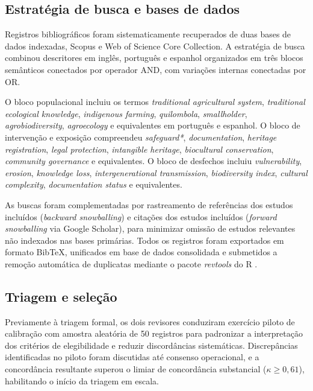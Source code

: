 \subsection{Estratégia de busca e bases de dados}
\label{sec:search_cap2}

Registros bibliográficos foram sistematicamente recuperados de duas bases de dados indexadas, Scopus e Web of Science Core Collection. A estratégia de busca combinou descritores em inglês, português e espanhol organizados em três blocos semânticos conectados por operador AND, com variações internas conectadas por OR.

O bloco populacional incluiu os termos \textit{traditional agricultural system}, \textit{traditional ecological knowledge}, \textit{indigenous farming}, \textit{quilombola}, \textit{smallholder}, \textit{agrobiodiversity}, \textit{agroecology} e equivalentes em português e espanhol. O bloco de intervenção e exposição compreendeu \textit{safeguard*}, \textit{documentation}, \textit{heritage registration}, \textit{legal protection}, \textit{intangible heritage}, \textit{biocultural conservation}, \textit{community governance} e equivalentes. O bloco de desfechos incluiu \textit{vulnerability}, \textit{erosion}, \textit{knowledge loss}, \textit{intergenerational transmission}, \textit{biodiversity index}, \textit{cultural complexity}, \textit{documentation status} e equivalentes.

As buscas foram complementadas por rastreamento de referências dos estudos incluídos (\textit{backward snowballing}) e citações dos estudos incluídos (\textit{forward snowballing} via Google Scholar), para minimizar omissão de estudos relevantes não indexados nas bases primárias. Todos os registros foram exportados em formato BibTeX, unificados em base de dados consolidada e submetidos a remoção automática de duplicatas mediante o pacote \textit{revtools} do R \cite{Westgate2019}.

\subsection{Triagem e seleção}
\label{sec:screening_cap2}

Previamente à triagem formal, os dois revisores conduziram exercício piloto de calibração com amostra aleatória de 50 registros para padronizar a interpretação dos critérios de elegibilidade e reduzir discordâncias sistemáticas. Discrepâncias identificadas no piloto foram discutidas até consenso operacional, e a concordância resultante superou o limiar de concordância substancial ($\kappa \geq 0{,}61$), habilitando o início da triagem em escala.

